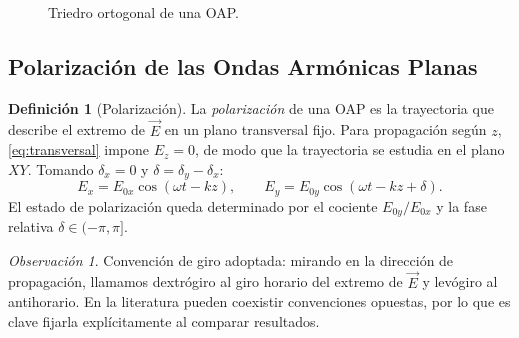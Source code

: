 \documentclass[12pt, a4paper]{article}
\theoremstyle{plain}
\theoremstyle{definition}
\newtheorem{definicion}[teorema]{Definición}
\theoremstyle{remark}
\newtheorem*{observacion}{Observación}
\newcommand{\ve}[1]{\vec{#1}}
\begin{document}
\begin{figure}[H]
  \centering
  \caption{Triedro ortogonal de una OAP.}
  \label{fig:triedro}
\end{figure}

\subsection{Polarización de las Ondas Armónicas Planas}

\begin{definicion}[Polarización]
La \emph{polarización} de una OAP es la trayectoria que describe el extremo de
$\ve{E}$ en un plano transversal fijo. Para propagación según $z$,
\eqref{eq:transversal} impone $E_z=0$, de modo que la trayectoria se estudia en
el plano $XY$. Tomando $\delta_x=0$ y $\delta=\delta_y-\delta_x$:
\begin{equation}
  E_x = E_{0x}\cos(\omega t - kz), \qquad
  E_y = E_{0y}\cos(\omega t - kz + \delta). \label{eq:polcomps}
\end{equation}
El estado de polarización queda determinado por el cociente
$E_{0y}/E_{0x}$ y la fase relativa $\delta\in(-\pi,\pi]$.
\end{definicion}

\begin{observacion}
Convención de giro adoptada: mirando en la dirección de propagación, llamamos
dextrógiro al giro horario del extremo de $\ve{E}$ y levógiro al antihorario.
En la literatura pueden coexistir convenciones opuestas, por lo que es clave
fijarla explícitamente al comparar resultados.
\end{observacion}
\end{document}
